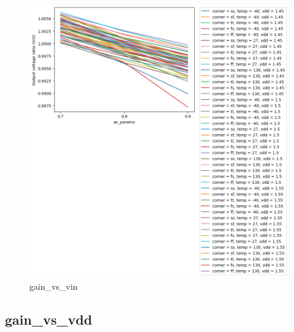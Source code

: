 \documentclass[
  a4paper,
  DIV=11,
  numbers=noendperiod]{scrartcl}
\begin{document}
\begin{tcolorbox}
\begin{figure}[H]
{\centering \includegraphics{./cace/_docs/ota-5t/schematic/gain_vs_vin.png}

}

\caption{gain\_vs\_vin}

\end{figure}%

\subsection{gain\_vs\_vdd}\label{gain_vs_vdd}

\begin{figure}[H]


\end{figure}
\end{tcolorbox}
\end{document}
